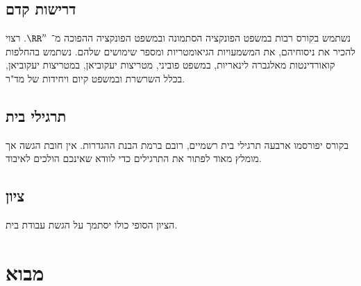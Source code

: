 \documentclass[a4paper,10pt,twoside,openany]{book}
\begin{document}
\section{דרישות קדם}
נשתמש בקורס רבות במשפט הפונקציה הסתמונה ובמשפט הפונקציה ההפוכה מ־%
$\RR^n$.
רצוי להכיר את ניסוחיהם, את המשמעויות הגיאומטריות ומספר שימושים שלהם.
נשתמש בהחלפות קואורדינטות מאלגברה לינאריות, במשפט פוביני, מטריצות יעקוביאן, במטריצות יעקוביאן, בכלל השרשרת ובמשפט קיום ויחידות של מד"ר.

\section{תרגילי בית}
בקורס יפורסמו ארבעה תרגילי בית רשמיים, רובם ברמת הבנת ההגדרות. אין חובת הגשה אך מומלץ מאוד לפתור את התרגילים כדי לוודא שאינכם הולכים לאיבוד.

\section{ציון}
הציון הסופי כולו יסתמך על הגשת עבודת בית.

\chapter{מבוא}
\end{document}
